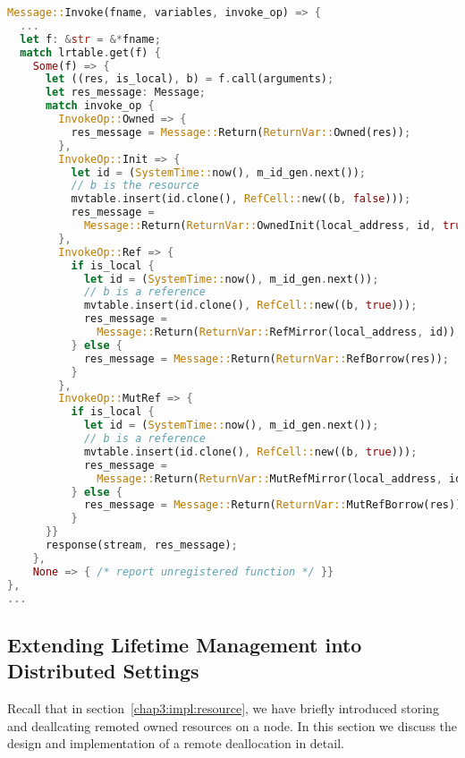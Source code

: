 \begin{lstlisting}[language=Rust, style=boxed, basicstyle=\footnotesize\ttfamily, caption={Executing an invocation and returning the result}, label=chap3:impl:lst:exec-return]
Message::Invoke(fname, variables, invoke_op) => {
  ...
  let f: &str = &*fname; 
  match lrtable.get(f) {
    Some(f) => {
      let ((res, is_local), b) = f.call(arguments);
      let res_message: Message;
      match invoke_op {
        InvokeOp::Owned => { 
          res_message = Message::Return(ReturnVar::Owned(res)); 
        },
        InvokeOp::Init => {
          let id = (SystemTime::now(), m_id_gen.next());
          // b is the resource
          mvtable.insert(id.clone(), RefCell::new((b, false)));
          res_message = 
            Message::Return(ReturnVar::OwnedInit(local_address, id, true));
        },
        InvokeOp::Ref => {
          if is_local {
            let id = (SystemTime::now(), m_id_gen.next());
            // b is a reference
            mvtable.insert(id.clone(), RefCell::new((b, true)));
            res_message =
              Message::Return(ReturnVar::RefMirror(local_address, id));
          } else { 
            res_message = Message::Return(ReturnVar::RefBorrow(res)); 
          }
        },
        InvokeOp::MutRef => {
          if is_local {
            let id = (SystemTime::now(), m_id_gen.next());
            // b is a reference
            mvtable.insert(id.clone(), RefCell::new((b, true)));
            res_message =
              Message::Return(ReturnVar::MutRefMirror(local_address, id));
          } else { 
            res_message = Message::Return(ReturnVar::MutRefBorrow(res)); 
          }
      }}
      response(stream, res_message);
    },
    None => { /* report unregistered function */ }}
},
...
\end{lstlisting}

\subsection{Extending Lifetime Management into Distributed Settings}
\label{chap3:impl:lifetime}
Recall that in section~\ref{chap3:impl:resource}, we have briefly introduced storing and deallcating remoted owned resources on a node. In this section we discuss the design and implementation of a remote deallocation in detail. 

